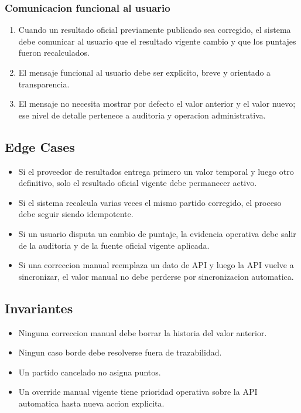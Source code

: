 \subsubsection{Comunicacion funcional al usuario}

\begin{enumerate}
  \item Cuando un resultado oficial previamente publicado sea corregido, el sistema debe comunicar al usuario que el resultado vigente cambio y que los puntajes fueron recalculados.
  \item El mensaje funcional al usuario debe ser explicito, breve y orientado a transparencia.
  \item El mensaje no necesita mostrar por defecto el valor anterior y el valor nuevo; ese nivel de detalle pertenece a auditoria y operacion administrativa.
\end{enumerate}

\subsection{Edge Cases}

\begin{itemize}
  \item Si el proveedor de resultados entrega primero un valor temporal y luego otro definitivo, solo el resultado oficial vigente debe permanecer activo.
  \item Si el sistema recalcula varias veces el mismo partido corregido, el proceso debe seguir siendo idempotente.
  \item Si un usuario disputa un cambio de puntaje, la evidencia operativa debe salir de la auditoria y de la fuente oficial vigente aplicada.
  \item Si una correccion manual reemplaza un dato de API y luego la API vuelve a sincronizar, el valor manual no debe perderse por sincronizacion automatica.
\end{itemize}

\subsection{Invariantes}

\begin{itemize}
  \item Ninguna correccion manual debe borrar la historia del valor anterior.
  \item Ningun caso borde debe resolverse fuera de trazabilidad.
  \item Un partido cancelado no asigna puntos.
  \item Un override manual vigente tiene prioridad operativa sobre la API automatica hasta nueva accion explicita.
\end{itemize}

